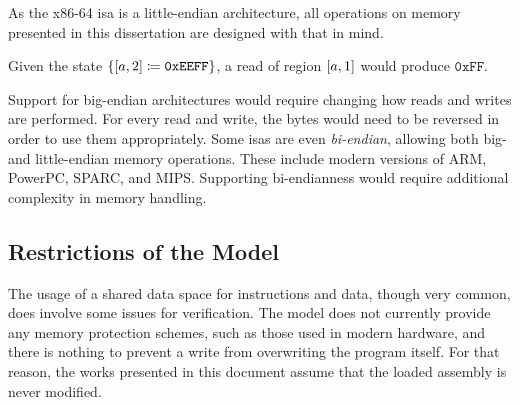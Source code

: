 
As the x86-64 \ac{isa} is a little-endian architecture,%
all operations on memory presented in this dissertation are designed with that in mind.
\begin{example}
  Given the state $\{[a,2]\coloneqq\mathtt{0xEEFF}\}$,
  a read of region $[a,1]$ would produce $\mathtt{0xFF}$.
\end{example}
Support for big-endian architectures would require changing how reads and writes%
are performed. For every read and write, the bytes would need to be reversed
in order to use them appropriately.
Some \acp{isa} are even \emph{bi-endian}, allowing both big- and little-endian%
memory operations. These include modern versions of ARM, PowerPC, SPARC, and MIPS.
Supporting bi-endianness would require additional complexity in memory handling.

\subsection{Restrictions of the Model}
The usage of a shared data space for instructions and data, though very common,
does involve some issues for verification.
The model does not currently provide any memory protection schemes,%
such as those used in modern hardware,
and there is nothing to prevent a write from overwriting the program itself.
For that reason,
the works presented in this document assume that the loaded assembly is never modified.

